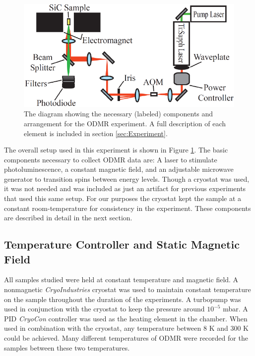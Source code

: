 \documentclass[oneside, astronomy, noacknowlegments]{BYUPhys}
\begin{document}
\begin{figure}
    \centerline{\includegraphics{setup_fig}}
    \caption[Diagram of Experimental Setup for ODMR]{\label{fig:setup}
     The diagram showing the necessary (labeled) components and arrangement for the ODMR experiment. A full description of each element is included in section \ref{sec:Experiment}.}
 \end{figure}

The overall setup used in this experiment is shown in Figure \ref{fig:setup}. The basic components necessary to collect ODMR data are: A laser to stimulate photoluminescence, a constant magnetic field, and an adjustable microwave generator to transition spins between energy levels. Though a cryostat was used, it was not needed and was included as just an artifact for previous experiments that used this same setup. For our purposes the cryostat kept the sample at a constant room-temperature for consistency in the experiment. These components are described in detail in the next section.

\subsection{Temperature Controller and Static Magnetic Field}

All samples studied were held at constant temperature and magnetic field. A nonmagnetic \textit{CryoIndustries} cryostat was used to maintain constant temperature on the sample throughout the duration of the experiments. A turbopump was used in conjunction with the cryostat to keep the pressure around $10^{-5}$ mbar. A PID \textit{CryoCon} controller was used as the heating element in the chamber. When used in combination with the cryostat, any temperature between 8 K and 300 K could be achieved. Many different temperatures of ODMR were recorded for the samples between these two temperatures.
\end{document}
